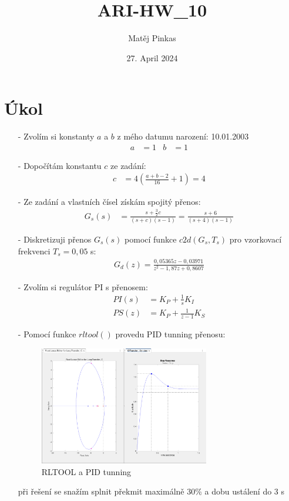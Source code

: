 \documentclass{article}
\title{ARI-HW\_10}
\author{Matěj Pinkas}
\date{27. April 2024}
\begin{document}
\maketitle

\section{Úkol}

\begin{itemize}
    \item[-] Zvolím si konstanty $a$ a $b$ z mého datumu narození: 10.01.2003
    \begin{align*}
        a &= 1 & b &= 1
    \end{align*}

    \item[-] Dopočítám konstantu $c$ ze zadání: 
    \begin{align*}
        c &= 4\left( \frac{a+b-2}{16}+1 \right) = 4
    \end{align*}

    \item[-] Ze zadání a vlastních čísel získám spojitý přenos: 
    \begin{align*}
        G_s(s) &= \frac{s+\frac{3}{2}c}{(s+c)(s-1)} = \frac{s+6}{(s+4)(s-1)}
    \end{align*}
    
    \item[-] Diskretizuji přenos $G_s(s)$ pomocí funkce $c2d(G_s,T_s)$ pro vzorkovací frekvenci $T_s = 0,05$ s:
    \begin{align*}
        G_d(z) = \frac{0,05365z-0,03971}{z^2-1,87z+0,8607} 
    \end{align*}
    
    \item[-] Zvolím si regulátor PI s přenosem:
    \begin{align*}
        PI(s) &= K_P + \frac{1}{s}K_I\\
        PS(z) &= K_P + \frac{1}{z-1}K_S
    \end{align*}

    \newpage
    \item[-] Pomocí funkce $rltool()$ provedu PID tunning přenosu:
    \begin{figure}[H]
        \centering
        \includegraphics[clip, width=0.70\textwidth]{rltool.png}
        \caption{RLTOOL a PID tunning}
        \label{fig:rltool}
    \end{figure}
    \item[] při řešení se snažím splnit překmit maximálně 30\% a dobu ustálení do 3 s 


\end{itemize}
\end{document}
